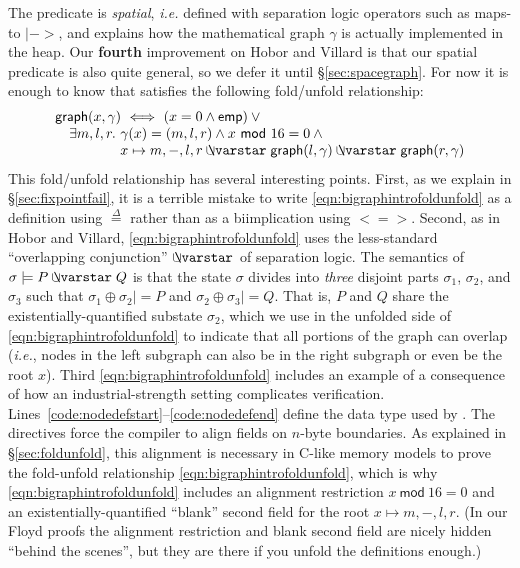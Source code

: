 The  predicate is \emph{spatial}, \emph{i.e.} defined with separation logic operators such as maps-to $|->$, and explains how the mathematical graph $\gamma$ is actually implemented in the heap.  Our \textbf{fourth} improvement on Hobor and Villard is that our spatial  predicate is also quite general, so we defer it until \S\ref{sec:spacegraph}.  For now it is enough to know that  satisfies the following fold/unfold relationship:
\begin{equation}
\label{eqn:bigraphintrofoldunfold}
\begin{array}{@{}l@{}}
\p{graph}(x, \gamma) ~ <=> ~ (x = 0 \wedge \p{emp}) \vee \null \\
\quad \exists m,l,r.~ \gamma(x)=(m,l,r) \wedge x~\mathsf{mod}~16 = 0 \wedge \null \\
\quad \qquad \quad ~~ x \mapsto m,-,l,r \ocon \p{graph}(l, \gamma) \ocon \p{graph}(r, \gamma)
\end{array}
\end{equation}
This fold/unfold relationship has several interesting points.  
First, as we explain in \S\ref{sec:fixpointfail}, it is a terrible mistake to write \eqref{eqn:bigraphintrofoldunfold} as a definition using $\stackrel{\Delta}{=}$ rather than as a biimplication using $<=>$.  Second, as in Hobor and Villard, \eqref{eqn:bigraphintrofoldunfold} uses the less-standard ``overlapping conjunction'' $\ocon$ of separation logic.  The semantics of $\sigma |= P \ocon Q$ is that the state $\sigma$ divides into \emph{three} disjoint parts $\sigma_1$, $\sigma_2$, and $\sigma_3$ such that $\sigma_1 \oplus \sigma_2 |= P$ and $\sigma_2 \oplus \sigma_3 |= Q$.  That is, $P$ and $Q$ share the existentially-quantified substate $\sigma_2$, which we use in the unfolded side of \eqref{eqn:bigraphintrofoldunfold} to indicate that all portions of the graph can overlap (\emph{i.e.}, nodes in the left subgraph can also be in the right subgraph or even be the root $x$).  Third \eqref{eqn:bigraphintrofoldunfold} includes an example of a consequence of how an industrial-strength setting complicates verification.  Lines~\ref{code:nodedefstart}--\ref{code:nodedefend} define the data type  used by .  The  directives force the compiler to align fields on $n$-byte boundaries.  As explained in \S\ref{sec:foldunfold}, this alignment is necessary in C-like memory models to prove the fold-unfold relationship \eqref{eqn:bigraphintrofoldunfold}, which is why \eqref{eqn:bigraphintrofoldunfold} includes an alignment restriction $x~\mathsf{mod}~16 = 0$ and an existentially-quantified ``blank'' second field for the root $x \mapsto m,-,l,r$.  (In our Floyd proofs the alignment restriction and blank second field are nicely hidden ``behind the scenes'', but they are there if you unfold the definitions enough.)

